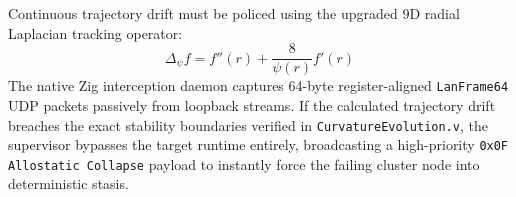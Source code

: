 Continuous trajectory drift must be policed using the upgraded 9D radial Laplacian tracking operator:
\begin{equation}
\Delta_{\psi} f = f''(r) + \frac{8}{\psi(r)} f'(r)
\end{equation}
The native Zig interception daemon captures 64-byte register-aligned \texttt{LanFrame64} UDP packets passively from loopback streams. If the calculated trajectory drift breaches the exact stability boundaries verified in \texttt{CurvatureEvolution.v}, the supervisor bypasses the target runtime entirely, broadcasting a high-priority \texttt{0x0F Allostatic Collapse} payload to instantly force the failing cluster node into deterministic stasis.
